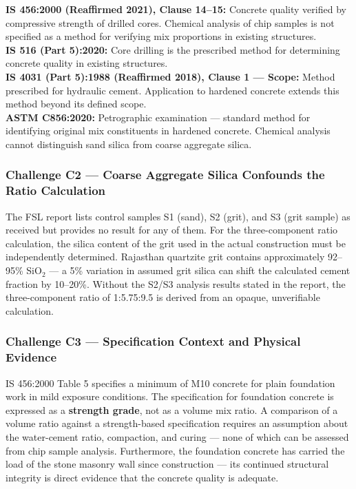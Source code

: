 \documentclass[12pt, a4paper]{article}
\begin{document}
\begin{standardbox}
\textbf{IS 456:2000 (Reaffirmed 2021), Clause 14--15:} Concrete quality verified by compressive strength of drilled cores. Chemical analysis of chip samples is not specified as a method for verifying mix proportions in existing structures.\\
\textbf{IS 516 (Part 5):2020:} Core drilling is the prescribed method for determining concrete quality in existing structures.\\
\textbf{IS 4031 (Part 5):1988 (Reaffirmed 2018), Clause 1 --- Scope:} Method prescribed for hydraulic cement. Application to hardened concrete extends this method beyond its defined scope.\\
\textbf{ASTM C856:2020:} Petrographic examination --- standard method for identifying original mix constituents in hardened concrete. Chemical analysis cannot distinguish sand silica from coarse aggregate silica.
\end{standardbox}

\subsubsection{Challenge C2 --- Coarse Aggregate Silica Confounds the Ratio Calculation}

The FSL report lists control samples S1 (sand), S2 (grit), and S3 (grit sample) as received but provides no result for any of them. For the three-component ratio calculation, the silica content of the grit used in the actual construction must be independently determined. Rajasthan quartzite grit contains approximately 92--95\% SiO$_2$ --- a 5\% variation in assumed grit silica can shift the calculated cement fraction by 10--20\%. Without the S2/S3 analysis results stated in the report, the three-component ratio of 1:5.75:9.5 is derived from an opaque, unverifiable calculation.

\subsubsection{Challenge C3 --- Specification Context and Physical Evidence}

IS 456:2000 Table 5 specifies a minimum of M10 concrete for plain foundation work in mild exposure conditions. The specification for foundation concrete is expressed as a \textbf{strength grade}, not as a volume mix ratio. A comparison of a volume ratio against a strength-based specification requires an assumption about the water-cement ratio, compaction, and curing --- none of which can be assessed from chip sample analysis. Furthermore, the foundation concrete has carried the load of the stone masonry wall since construction --- its continued structural integrity is direct evidence that the concrete quality is adequate.
\end{document}
